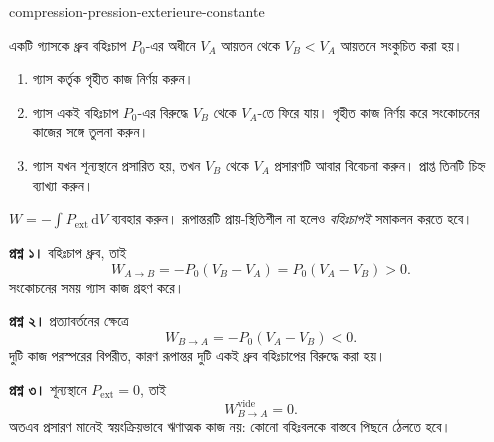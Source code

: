 \begin{exo}[ধ্রুব বহিঃচাপে সংকোচন]{compression-pression-exterieure-constante}

একটি গ্যাসকে ধ্রুব বহিঃচাপ $P_0$-এর অধীনে $V_A$ আয়তন থেকে $V_B<V_A$ আয়তনে সংকুচিত করা হয়।

\begin{enumerate}
\item গ্যাস কর্তৃক গৃহীত কাজ নির্ণয় করুন।
\item গ্যাস একই বহিঃচাপ $P_0$-এর বিরুদ্ধে $V_B$ থেকে $V_A$-তে ফিরে যায়। গৃহীত কাজ নির্ণয় করে সংকোচনের কাজের সঙ্গে তুলনা করুন।
\item গ্যাস যখন শূন্যস্থানে প্রসারিত হয়, তখন $V_B$ থেকে $V_A$ প্রসারণটি আবার বিবেচনা করুন। প্রাপ্ত তিনটি চিহ্ন ব্যাখ্যা করুন।
\end{enumerate}

\begin{indication}
$W=-\int P_{\mathrm{ext}}\,\mathrm{d}V$ ব্যবহার করুন। রূপান্তরটি প্রায়-স্থিতিশীল
না হলেও \emph{বহিঃচাপই} সমাকলন করতে হবে।
\end{indication}

\begin{solution}
\textbf{প্রশ্ন ১।} বহিঃচাপ ধ্রুব, তাই
\[
W_{A\to B}=-P_0(V_B-V_A)=P_0(V_A-V_B)>0.
\]
সংকোচনের সময় গ্যাস কাজ গ্রহণ করে।

\textbf{প্রশ্ন ২।} প্রত্যাবর্তনের ক্ষেত্রে
\[
W_{B\to A}=-P_0(V_A-V_B)<0.
\]
দুটি কাজ পরস্পরের বিপরীত, কারণ রূপান্তর দুটি একই ধ্রুব বহিঃচাপের বিরুদ্ধে করা হয়।

\textbf{প্রশ্ন ৩।} শূন্যস্থানে $P_{\mathrm{ext}}=0$, তাই
\[
W_{B\to A}^{\mathrm{vide}}=0.
\]
অতএব প্রসারণ মানেই স্বয়ংক্রিয়ভাবে ঋণাত্মক কাজ নয়: কোনো বহিঃবলকে বাস্তবে
পিছনে ঠেলতে হবে।
\end{solution}
\end{exo}
